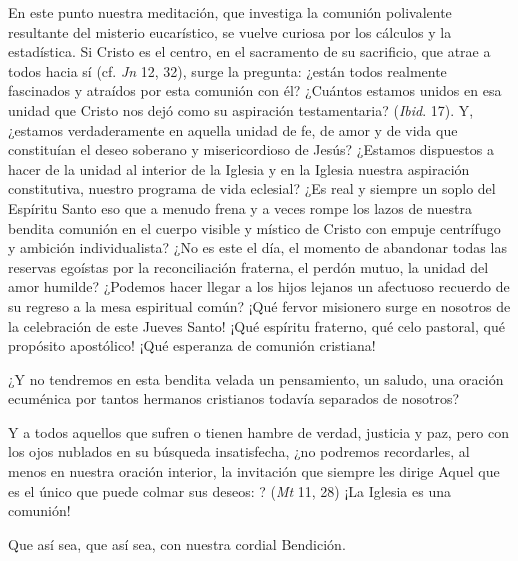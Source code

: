 \begin{body}
En este punto nuestra meditación, que investiga la comunión polivalente resultante del misterio eucarístico, se vuelve curiosa por los cálculos y la estadística. Si Cristo es el centro, en el sacramento de su sacrificio, que atrae a todos hacia sí (cf. \textit{Jn} 12, 32), surge la pregunta: ¿están todos realmente fascinados y atraídos por esta comunión con él? ¿Cuántos estamos unidos en esa unidad que Cristo nos dejó como su aspiración testamentaria? (\textit{Ibid}. 17). Y, ¿estamos verdaderamente en aquella unidad de fe, de amor y de vida que constituían el deseo soberano y misericordioso de Jesús? ¿Estamos dispuestos a hacer de la unidad al interior de la Iglesia y en la Iglesia nuestra aspiración constitutiva, nuestro programa de vida eclesial? ¿Es real y siempre un soplo del Espíritu Santo eso que a menudo frena y a veces rompe los lazos de nuestra bendita comunión en el cuerpo visible y místico de Cristo con empuje centrífugo y ambición individualista? ¿No es este el día, el momento de abandonar todas las reservas egoístas por la reconciliación fraterna, el perdón mutuo, la unidad del amor humilde? ¿Podemos hacer llegar a los hijos lejanos un afectuoso recuerdo de su regreso a la mesa espiritual común? ¡Qué fervor misionero surge en nosotros de la celebración de este Jueves Santo! ¡Qué espíritu fraterno, qué celo pastoral, qué propósito apostólico! ¡Qué esperanza de comunión cristiana!

¿Y no tendremos en esta bendita velada un pensamiento, un saludo, una oración ecuménica por tantos hermanos cristianos todavía separados de nosotros? 

Y a todos aquellos que sufren o tienen hambre de verdad, justicia y paz, pero con los ojos nublados en su búsqueda insatisfecha, ¿no podremos recordarles, al menos en nuestra oración interior, la invitación que siempre les dirige Aquel que es el único que puede colmar sus deseos: ? (\textit{Mt} 11, 28) ¡La Iglesia es una comunión!

Que así sea, que así sea, con nuestra cordial Bendición.
\end{body}

